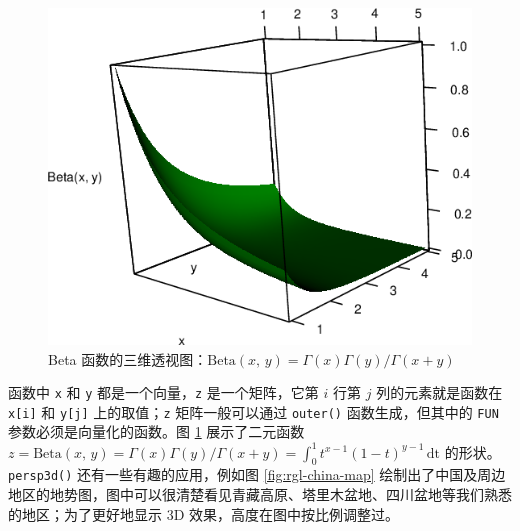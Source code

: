 \documentclass[
  b5paper,
  UTF8,twoside]{book}
\begin{document}
\begin{figure}

{\centering \includegraphics{images/rgl-beta} 

}

\caption[Beta 函数的三维透视图]{Beta 函数的三维透视图：\(\mathrm{Beta}(x,\,y) = \Gamma(x)\Gamma(y)/\Gamma(x+y)\)}\label{fig:rgl-beta}
\end{figure}





函数中 \texttt{x} 和 \texttt{y} 都是一个向量，\texttt{z} 是一个矩阵，它第 \(i\) 行第 \(j\) 列的元素就是函数在 \texttt{x{[}i{]}} 和 \texttt{y{[}j{]}} 上的取值；\texttt{z} 矩阵一般可以通过 \texttt{outer()} 函数生成，但其中的 \texttt{FUN} 参数必须是向量化的函数。图 \ref{fig:rgl-beta} 展示了二元函数 \(z = \mathrm{Beta}(x,\,y) = \Gamma(x)\Gamma(y)/\Gamma(x+y) = \int_{0}^{1}t^{x-1}(1-t)^{y-1}\,\mathrm{dt}\) 的形状。\texttt{persp3d()} 还有一些有趣的应用，例如图 \ref{fig:rgl-china-map} 绘制出了中国及周边地区的地势图，图中可以很清楚看见青藏高原、塔里木盆地、四川盆地等我们熟悉的地区；为了更好地显示 3D 效果，高度在图中按比例调整过。
\end{document}
